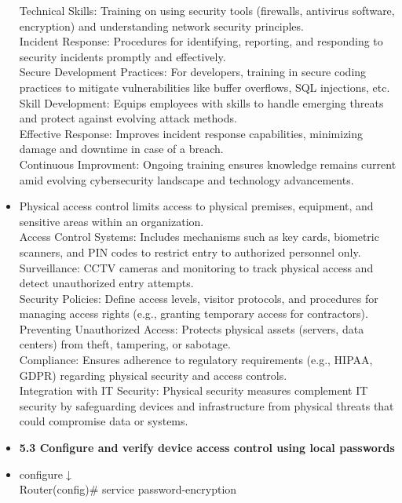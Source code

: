 \documentclass{article}
\begin{document}
\begin{itemize}
	Technical Skills: Training on using security tools (firewalls, antivirus software, encryption) and understanding network security principles.\\
	Incident Response: Procedures for identifying, reporting, and responding to security incidents promptly and effectively.\\
	Secure Development Practices: For developers, training in secure coding practices to mitigate vulnerabilities like buffer overflows, SQL injections, etc.\\
	Skill Development: Equips employees with skills to handle emerging threats and protect against evolving attack methods.\\
	Effective Response: Improves incident response capabilities, minimizing damage and downtime in case of a breach.\\
	Continuous Improvment: Ongoing training ensures knowledge remains current amid evolving cybersecurity landscape and technology advancements.
	\item[] Physical access control limits access to physical premises, equipment, and sensitive areas within an organization.\\
	Access Control Systems: Includes mechanisms such as key cards, biometric scanners, and PIN codes to restrict entry to authorized personnel only.\\
	Surveillance: CCTV cameras and monitoring to track physical access and detect unauthorized entry attempts.\\
	Security Policies: Define access levels, visitor protocols, and procedures for managing access rights (e.g., granting temporary access for contractors).\\
	Preventing Unauthorized Access: Protects physical assets (servers, data centers) from theft, tampering, or sabotage.\\
	Compliance: Ensures adherence to regulatory requirements (e.g., HIPAA, GDPR) regarding physical security and access controls.\\
	Integration with IT Security: Physical security measures complement IT security by safeguarding devices and infrastructure from physical threats that could compromise data or systems.
  
  \item \textbf{5.3 Configure and verify device access control using local passwords}
  	\item[] configure$\downarrow$\\
  		Router(config)\# service password-encryption\\
  		

\end{itemize}
\end{document}
